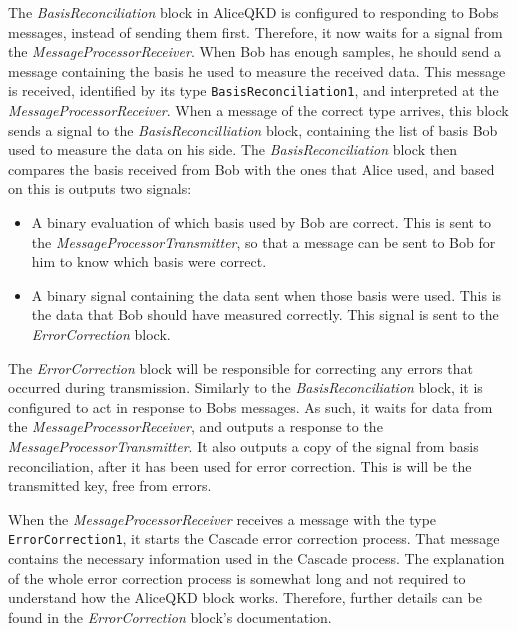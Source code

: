 The \textit{BasisReconciliation} block in AliceQKD is configured to responding
to Bobs messages, instead of sending them first. Therefore, it now waits for a 
signal from the 
\textit{MessageProcessorReceiver}. When Bob has enough samples, he should send 
a message containing the basis he used to measure the received data. This 
message is received, identified by its type \texttt{BasisReconciliation1}, and 
interpreted at the \textit{MessageProcessorReceiver}. 
When a message of the correct type arrives, this block sends a signal to the 
\textit{BasisReconcilliation} block, containing the list of basis Bob used to 
measure the data on his side. The \textit{BasisReconciliation} block then 
compares the basis received from Bob with the ones that Alice used, and based 
on this is outputs two signals:

\begin{itemize}
	\item A binary evaluation of which basis used 
	by Bob are correct. This is sent to the \textit{MessageProcessorTransmitter}, 
	so that a message can be sent to Bob for him to know which basis were correct.
	\item A binary signal containing the data sent when those basis were used. 
	This is the data that Bob should have measured correctly. This signal is sent 
	to the \textit{ErrorCorrection} block.
\end{itemize} 

The \textit{ErrorCorrection} block will be responsible for correcting any 
errors that occurred during transmission. Similarly to the 
\textit{BasisReconciliation} block, it is configured to act in response to Bobs 
messages. As such, it waits for data from the 
\textit{MessageProcessorReceiver}, and outputs a response to the 
\textit{MessageProcessorTransmitter}. It also outputs a copy of the 
signal from basis reconciliation, after it has been used for error correction. 
This is will be the transmitted key, free from errors.


When the \textit{MessageProcessorReceiver} receives a message with the type 
\texttt{ErrorCorrection1}, it starts the Cascade error correction process.
That message contains the necessary information used in the Cascade process. 
The explanation of the whole error correction process is somewhat long and not 
required to understand how the AliceQKD block works. Therefore, further details 
can be found in the \textit{ErrorCorrection} block's documentation.

